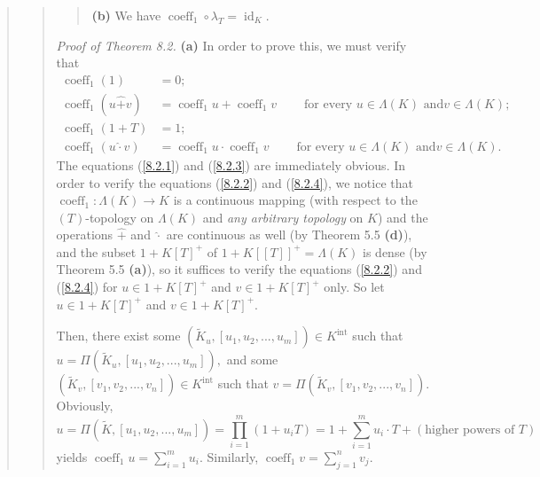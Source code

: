 \documentclass[12pt,final,notitlepage,onecolumn,german]{article}%
\begin{document}
\begin{quote}
\begin{quote}
\begin{quote}
\textbf{(b)} We have $\operatorname*{coeff}\nolimits_{1}\circ\lambda
_{T}=\operatorname*{id}_{K}$.
\end{quote}

\textit{Proof of Theorem 8.2.} \textbf{(a)} In order to prove this, we must
verify that%
\begin{align}
\operatorname*{coeff}\nolimits_{1}\left(  1\right)   &  =0;\label{8.2.1}\\
\operatorname*{coeff}\nolimits_{1}\left(  u\widehat{+}v\right)   &
=\operatorname*{coeff}\nolimits_{1}u+\operatorname*{coeff}\nolimits_{1}%
v\ \ \ \ \ \ \ \ \ \ \text{for every }u\in\Lambda\left(  K\right)  \text{ and
}v\in\Lambda\left(  K\right)  ;\label{8.2.2}\\
\operatorname*{coeff}\nolimits_{1}\left(  1+T\right)   &  =1;\label{8.2.3}\\
\operatorname*{coeff}\nolimits_{1}\left(  u\widehat{\cdot}v\right)   &
=\operatorname*{coeff}\nolimits_{1}u\cdot\operatorname*{coeff}\nolimits_{1}%
v\ \ \ \ \ \ \ \ \ \ \text{for every }u\in\Lambda\left(  K\right)  \text{ and
}v\in\Lambda\left(  K\right)  . \label{8.2.4}%
\end{align}
The equations (\ref{8.2.1}) and (\ref{8.2.3}) are immediately obvious. In
order to verify the equations (\ref{8.2.2}) and (\ref{8.2.4}), we notice that
$\operatorname*{coeff}\nolimits_{1}:\Lambda\left(  K\right)  \rightarrow K$ is
a continuous mapping (with respect to the $\left(  T\right)  $-topology on
$\Lambda\left(  K\right)  $ and \textit{any arbitrary topology} on $K$) and
the operations $\widehat{+}$ and $\widehat{\cdot}$ are continuous as well (by
Theorem 5.5 \textbf{(d)}), and the subset $1+K\left[  T\right]  ^{+}$ of
$1+K\left[  \left[  T\right]  \right]  ^{+}=\Lambda\left(  K\right)  $ is
dense (by Theorem 5.5 \textbf{(a)}), so it suffices to verify the equations
(\ref{8.2.2}) and (\ref{8.2.4}) for $u\in1+K\left[  T\right]  ^{+}$ and
$v\in1+K\left[  T\right]  ^{+}$ only. So let $u\in1+K\left[  T\right]  ^{+}$
and $v\in1+K\left[  T\right]  ^{+}$.

Then, there exist some $\left(  \widetilde{K}_{u},\left[  u_{1},u_{2}%
,...,u_{m}\right]  \right)  \in K^{\operatorname*{int}}$ such that
$u=\Pi\left(  \widetilde{K}_{u},\left[  u_{1},u_{2},...,u_{m}\right]  \right)
,$ and some $\left(  \widetilde{K}_{v},\left[  v_{1},v_{2},...,v_{n}\right]
\right)  \in K^{\operatorname*{int}}$ such that $v=\Pi\left(  \widetilde
{K}_{v},\left[  v_{1},v_{2},...,v_{n}\right]  \right)  .$ Obviously,%
\[
u=\Pi\left(  \widetilde{K},\left[  u_{1},u_{2},...,u_{m}\right]  \right)
=\prod_{i=1}^{m}\left(  1+u_{i}T\right)  =1+\sum_{i=1}^{m}u_{i}\cdot T+\left(
\text{higher powers of }T\right)
\]
yields $\operatorname*{coeff}\nolimits_{1}u=\sum\limits_{i=1}^{m}u_{i}.$
Similarly, $\operatorname*{coeff}\nolimits_{1}v=\sum\limits_{j=1}^{n}v_{j}$.


\end{quote}
\end{quote}
\end{document}
